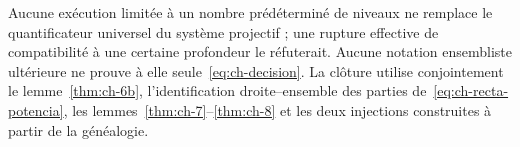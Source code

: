Aucune exécution limitée à un nombre prédéterminé de niveaux ne remplace le quantificateur universel du système projectif ; une rupture effective de compatibilité à une certaine profondeur le réfuterait. Aucune notation ensembliste ultérieure ne prouve à elle seule~\eqref{eq:ch-decision}. La clôture utilise conjointement le lemme~\ref{thm:ch-6b}, l'identification droite--ensemble des parties de~\eqref{eq:ch-recta-potencia}, les lemmes~\ref{thm:ch-7}--\ref{thm:ch-8} et les deux injections construites à partir de la généalogie.
